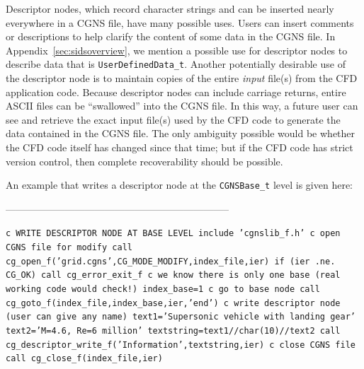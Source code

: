 \documentclass[12pt]{article}
\begin{document}
Descriptor nodes, which record character strings and can be
inserted nearly everywhere in a CGNS file, have many 
possible uses.
Users can insert comments or descriptions
to help clarify the content of some data in the CGNS file.  In Appendix~\ref{sec:sidsoverview},
we mention a possible use for descriptor nodes to describe
data that is {\tt UserDefinedData\_t}.
Another potentially desirable use of the descriptor node is
to maintain copies of the entire {\it input} file(s)
from the CFD application code.  Because descriptor nodes
can include carriage returns, entire ASCII files can be 
``swallowed'' into the CGNS file.  In this way, a future user
can see and retrieve the exact input file(s) used by
the CFD code to generate
the data contained in the CGNS file.  The only ambiguity
possible would be whether the CFD code itself has changed since
that time; but if the CFD code has strict version control,
then complete recoverability should be possible.

An example that writes a descriptor node at the {\tt CGNSBase\_t} level
is given here:

--------------------------------------------------------------------

{\tt \noindent c  WRITE DESCRIPTOR NODE AT BASE LEVEL
\newline\indent      include 'cgnslib\_f.h'
\newline c  open CGNS file for modify
\newline\indent      call cg\_open\_f('grid.cgns',CG\_MODE\_MODIFY,index\_file,ier)
\newline\indent      if (ier .ne. CG\_OK) call cg\_error\_exit\_f
\newline c  we know there is only one base (real working code would check!)
\newline\indent      index\_base=1
\newline c   go to base node
\newline\indent      call cg\_goto\_f(index\_file,index\_base,ier,'end')
\newline c   write descriptor node (user can give any name)
\newline\indent      text1='Supersonic vehicle with landing gear'
\newline\indent      text2='M=4.6, Re=6 million'
\newline\indent      textstring=text1//char(10)//text2
\newline\indent      call cg\_descriptor\_write\_f('Information',textstring,ier)
\newline c  close CGNS file
\newline\indent      call cg\_close\_f(index\_file,ier)}
\end{document}
